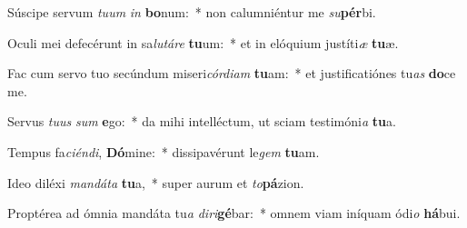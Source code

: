 \item Súscipe servum \textit{tu}\textit{um} \textit{in} \textbf{bo}num:~* non calumniéntur me \textit{su}\textbf{pér}bi.
\item Oculi mei defecérunt in sa\textit{lu}\textit{tá}\textit{re} \textbf{tu}um:~* et in elóquium justíti\textit{æ} \textbf{tu}æ.
\item Fac cum servo tuo secúndum miseri\textit{cór}\textit{di}\textit{am} \textbf{tu}am:~* et justificatiónes tu\textit{as} \textbf{do}ce me.
\item Servus \textit{tu}\textit{us} \textit{sum} \textbf{e}go:~* da mihi intelléctum, ut sciam testimóni\textit{a} \textbf{tu}a.
\item Tempus fa\textit{ci}\textit{én}\textit{di}, \textbf{Dó}mine:~* dissipavérunt le\textit{gem} \textbf{tu}am.
\item Ideo diléxi \textit{man}\textit{dá}\textit{ta} \textbf{tu}a,~* super aurum et \textit{to}\textbf{pá}zion.
\item Proptérea ad ómnia mandáta tu\textit{a} \textit{di}\textit{ri}\textbf{gé}bar:~* omnem viam iníquam ódi\textit{o} \textbf{há}bui.
